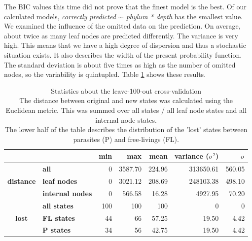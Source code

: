       The BIC values this time did not prove that the finest model is the best. Of our calculated models, 
       \textit{correctly predicted $\sim$ phylum * depth} has the smallest value. \\

      We examined the influence of the omitted data on the prediction. On average, about twice as many 
        leaf nodes are predicted differently. \color{red}The variance is very high. This means that 
        we have a high degree of dispersion and thus a stochastic situation exists. It also describes 
        the width of the present probability function. The standard deviation is about five times as 
        high as the number of omitted nodes, so the variability is quintupled. \color{black} Table 
        \ref{table:statistics cross-validation} shows these results. \\
      \begin{table}[h!]
        \begin{center}
          \begin{tabular}{ |cl||r|r|r|r|r| }
            \hline
            & & \bfseries min & \bfseries max & \bfseries mean & \bfseries variance ($\sigma^2$) & $\sigma$ \\
            \hline \hline
            \multirow{3}{*}{\bfseries distance} & \bfseries all     & 0 & 3587.70 & 224.96 & 313650.61 & 560.05 \\
            & \bfseries leaf nodes                                  & 0 & 3021.12 & 208.69 & 248103.38 & 498.10 \\
            & \bfseries internal nodes                              & 0 & 566.58 & 16.28 & 4927.95 & 70.20 \\ \hline
            \multirow{3}{*}{\bfseries lost} & \bfseries all states  & 100 & 100 & 100 & 0 & 0 \\
            & \bfseries FL states                                   & 44 & 66 & 57.25 & 19.50 & 4.42 \\
            & \bfseries P states                                    & 34 & 56 & 42.75 & 19.50 & 4.42 \\
            \hline
          \end{tabular}
        \end{center}
        \caption{Statistics about the leave-100-out cross-validation \\
          The distance between original and new states was calculated using the Euclidean metric. This 
            was summed over all states / all leaf node states and all internal node states. \\
          The lower half of the table describes the distribution of the 'lost' states between parasites 
            (P) and free-livings (FL).}
        \label{table:statistics cross-validation}
      \end{table}

